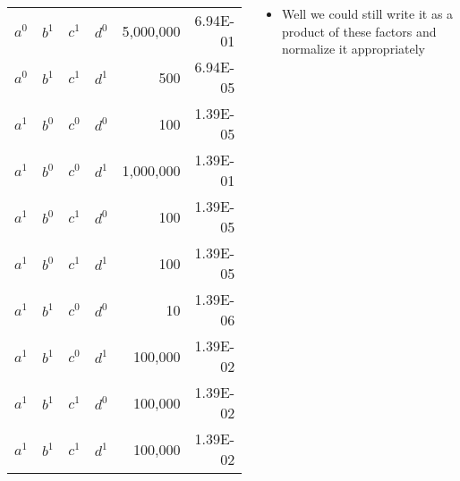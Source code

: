 \begin{frame}
\begin{columns}
\begin{overlayarea}{\textwidth}{\textheight}
\begin{center}
\begin{table}
{\begin{tabular}{|cccc|r|r|}
$a^0$       & $b^1$      & $c^1$      & $d^0$      & 5,000,000                                           & 6.94E-01                                          \\
$a^0$       & $b^1$      & $c^1$      & $d^1$      & 500                                                 & 6.94E-05                                          \\
$a^1$       & $b^0$      & $c^0$      & $d^0$      & 100                                                 & 1.39E-05                                          \\
$a^1$       & $b^0$      & $c^0$      & $d^1$      & 1,000,000                                           & 1.39E-01                                          \\
$a^1$       & $b^0$      & $c^1$      & $d^0$      & 100                                                 & 1.39E-05                                          \\
$a^1$       & $b^0$      & $c^1$      & $d^1$      & 100                                                 & 1.39E-05                                          \\
$a^1$       & $b^1$      & $c^0$      & $d^0$      & 10                                                  & 1.39E-06                                          \\
$a^1$       & $b^1$      & $c^0$      & $d^1$      & 100,000                                             & 1.39E-02                                          \\
$a^1$       & $b^1$      & $c^1$      & $d^0$      & 100,000                                             & 1.39E-02                                          \\
$a^1$       & $b^1$      & $c^1$      & $d^1$      & 100,000                                             & 1.39E-02                                          \\ \hline
\end{tabular}}
		\end{table}
		\end{center}
		\end{overlayarea}
		\begin{overlayarea}{\textwidth}{\textheight}
		\begin{itemize}\justifying
			\item<1-> Well we could still write it as a product of these factors \onslide<+-> and normalize it appropriately
\end{itemize}
\end{overlayarea}
\end{columns}
\end{frame}
